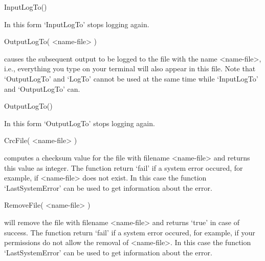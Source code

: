 \)InputLogTo()

In this form `InputLogTo' stops logging again.

\>OutputLogTo( <name-file> )

causes the subsequent   output to be logged   to the file  with  the name
<name-file>, i.e., everything you type on your  terminal will also appear
in this file.  Note that `OutputLogTo' and `LogTo' cannot  be used at the
same time while `InputLogTo' and `OutputLogTo' can.

\)OutputLogTo()

In this form `OutputLogTo' stops logging again.

\>CrcFile( <name-file> )

computes a checksum value for the file  with filename <name-file> and returns
this value as integer. The function return  `fail' if a system error occured,
for  example,  if <name-file>  does not  exist.   In this   case the function
`LastSystemError' can be used to get information about the error.

\>RemoveFile( <name-file> )

will remove the file with filename <name-file>  and returns `true' in case of
success.  The function return `fail' if a system  error occured, for example,
if your  permissions do not allow the  removal of <name-file>.  In  this case
the  function  `LastSystemError' can  be  used  to get  information about the
error.

